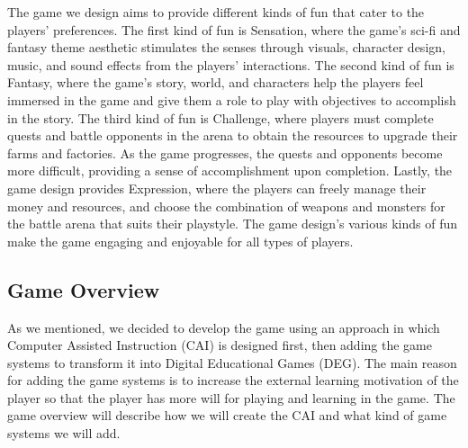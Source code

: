 \documentclass[12pt,oneside,openright,a4paper]{cpe-english-project}
\begin{document}
%
\hspace{2em}The game we design aims to provide different kinds of fun that cater to the players' preferences. The first kind of fun is Sensation, where the game's sci-fi and fantasy theme aesthetic stimulates the senses through visuals, character design, music, and sound effects from the players' interactions. The second kind of fun is Fantasy, where the game's story, world, and characters help the players feel immersed in the game and give them a role to play with objectives to accomplish in the story. The third kind of fun is Challenge, where players must complete quests and battle opponents in the arena to obtain the resources to upgrade their farms and factories. As the game progresses, the quests and opponents become more difficult, providing a sense of accomplishment upon completion. Lastly, the game design provides Expression, where the players can freely manage their money and resources, and choose the combination of weapons and monsters for the battle arena that suits their playstyle. The game design's various kinds of fun make the game engaging and enjoyable for all types of players.

\subsection{Game Overview}
	As we mentioned, we decided to develop the game using an approach in which Computer Assisted Instruction (CAI) is designed first, then adding the game systems to transform it into Digital Educational Games (DEG). The main reason for adding the game systems is to increase the external learning motivation of the player so that the player has more will for playing and learning in the game. The game overview will describe how we will create the CAI and what kind of game systems we will add.
\end{document}
